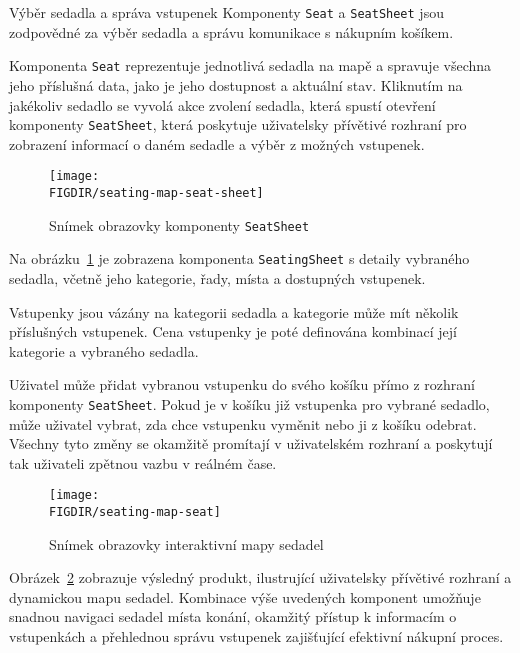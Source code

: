 \begin{subsection}{Výběr sedadla a správa vstupenek}
    \label{subsec:implementace-seating-seat}
    Komponenty \texttt{Seat} a \texttt{SeatSheet} jsou zodpovědné za výběr sedadla a správu komunikace s nákupním košíkem.

    Komponenta \texttt{Seat} reprezentuje jednotlivá sedadla na mapě a spravuje všechna jeho příslušná data, jako je jeho dostupnost a aktuální stav.
    Kliknutím na jakékoliv sedadlo se vyvolá akce zvolení sedadla, která spustí otevření komponenty \texttt{SeatSheet}, která poskytuje uživatelsky přívětivé rozhraní pro zobrazení informací o daném sedadle a výběr z možných vstupenek.

    \begin{figure}[h]
        \centering
        \texttt{[image: \\FIGDIR/seating-map-seat-sheet]}
        \caption{Snímek obrazovky komponenty \texttt{SeatSheet}}
        \label{fig:seating-map-seats-sheet}
    \end{figure}

    Na obrázku~\ref{fig:seating-map-seats-sheet} je zobrazena komponenta \texttt{SeatingSheet} s detaily vybraného sedadla, včetně jeho kategorie, řady, místa a dostupných vstupenek.

    Vstupenky jsou vázány na kategorii sedadla a kategorie může mít několik příslušných vstupenek.
    Cena vstupenky je poté definována kombinací její kategorie a vybraného sedadla.

    Uživatel může přidat vybranou vstupenku do svého košíku přímo z rozhraní komponenty \texttt{SeatSheet}.
    Pokud je v košíku již vstupenka pro vybrané sedadlo, může uživatel vybrat, zda chce vstupenku vyměnit nebo ji z košíku odebrat.
    Všechny tyto změny se okamžitě promítají v uživatelském rozhraní a poskytují tak uživateli zpětnou vazbu v reálném čase.

    \begin{figure}[h]
        \centering
        \texttt{[image: \\FIGDIR/seating-map-seat]}
        \caption{Snímek obrazovky interaktivní mapy sedadel}
        \label{fig:seating-map-seat}
    \end{figure}

    Obrázek~\ref{fig:seating-map-seat} zobrazuje výsledný produkt, ilustrující uživatelsky přívětivé rozhraní a dynamickou mapu sedadel.
    Kombinace výše uvedených komponent umožňuje snadnou navigaci sedadel místa konání, okamžitý přístup k informacím o vstupenkách a přehlednou správu vstupenek zajišťující efektivní nákupní proces.
\end{subsection}
